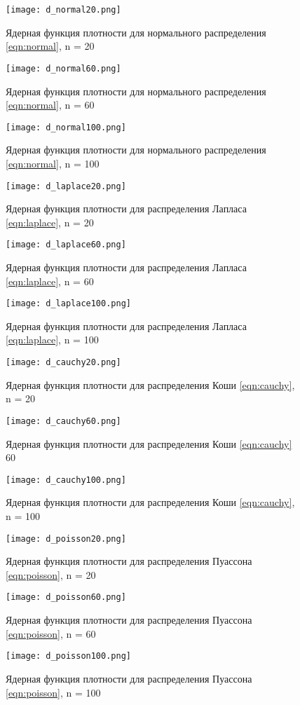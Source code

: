 \documentclass[a4]{article}
\begin{document}
\begin{center}
    \begin{figure}[H]
 \caption{Ядерная функция плотности для нормального распределения \eqref{eqn:normal}, n = 20}
\texttt{[image: d\_normal20.png]}
\end{figure}
    \begin{figure}[H]
 \caption{Ядерная функция плотности для нормального распределения \eqref{eqn:normal}, n = 60}
\texttt{[image: d\_normal60.png]}
\end{figure}
    \begin{figure}[H]
 \caption{Ядерная функция плотности для нормального распределения \eqref{eqn:normal}, n = 100}
\texttt{[image: d\_normal100.png]}
\end{figure}

    \begin{figure}[H]
 \caption{Ядерная функция плотности для распределения Лапласа \eqref{eqn:laplace}, n = 20}
\texttt{[image: d\_laplace20.png]}
\end{figure}
    \begin{figure}[H]
 \caption{Ядерная функция плотности для распределения Лапласа \eqref{eqn:laplace}, n = 60}
\texttt{[image: d\_laplace60.png]}
\end{figure}
    \begin{figure}[H]
 \caption{Ядерная функция плотности для распределения Лапласа \eqref{eqn:laplace}, n = 100}
\texttt{[image: d\_laplace100.png]}
\end{figure}

    \begin{figure}[H]
 \caption{Ядерная функция плотности для распределения Коши \eqref{eqn:cauchy}, n = 20}
\texttt{[image: d\_cauchy20.png]}
\end{figure}
    \begin{figure}[H]
 \caption{Ядерная функция плотности для распределения Коши \eqref{eqn:cauchy} 60}
\texttt{[image: d\_cauchy60.png]}
\end{figure}
    \begin{figure}[H]
 \caption{Ядерная функция плотности для распределения Коши \eqref{eqn:cauchy}, n = 100}
\texttt{[image: d\_cauchy100.png]}
\end{figure}

    \begin{figure}[H]
 \caption{Ядерная функция плотности для распределения Пуассона \eqref{eqn:poisson}, n = 20}
\texttt{[image: d\_poisson20.png]}
\end{figure}
    \begin{figure}[H]
 \caption{Ядерная функция плотности для распределения Пуассона \eqref{eqn:poisson}, n = 60}
\texttt{[image: d\_poisson60.png]}
\end{figure}
    \begin{figure}[H]
 \caption{Ядерная функция плотности для распределения Пуассона \eqref{eqn:poisson}, n = 100}
\texttt{[image: d\_poisson100.png]}
\end{figure}


\end{center}
\end{document}
